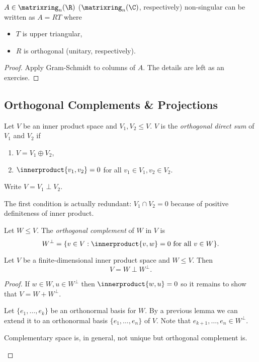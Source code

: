 \documentclass[a4paper]{article}
\newcommand*{\M}{\matrixring}
\newcommand*{\ip}{\innerproduct}
\theoremstyle{definition}
\begin{document}
\begin{proposition}
  \(A \in \M_n(\R)\) (\(\M_n(\C)\), respectively) non-singular can be written as \(A = RT\) where
  \begin{itemize}
  \item \(T\) is upper triangular,
  \item \(R\) is orthogonal (unitary, respectively).
  \end{itemize}
\end{proposition}

\begin{proof}
  Apply Gram-Schmidt to columns of \(A\). The details are left as an exercise.
\end{proof}

\subsection{Orthogonal Complements \& Projections}

\begin{definition}
  Let \(V\) be an inner product space and \(V_1, V_2 \leq V\). \(V\) is the \emph{orthogonal direct sum} of \(V_1\) and \(V_2\) if
  \begin{enumerate}
  \item \(V = V_1 \oplus V_2\),
  \item \(\ip{v_1, v_2} = 0\) for all \(v_1 \in V_1, v_2 \in V_2\).
  \end{enumerate}
  Write \(V = V_1 \perp V_2\).
\end{definition}

\begin{note}
  The first condition is actually redundant: \(V_1 \cap V_2 = 0\) because of positive definiteness of inner product.
\end{note}

\begin{definition}
  Let \(W \leq V\). The \emph{orthogonal complement} of \(W\) in \(V\) is
  \[
    W^\perp = \{v \in V: \ip{v, w} = 0 \text{ for all } v \in W \}.
  \]
\end{definition}

\begin{lemma}
  Let \(V\) be a finite-dimensional inner product space and \(W \leq V\). Then
  \[
    V =  W \perp W^\perp.
  \]
\end{lemma}

\begin{proof}
  If \(w \in W, u \in W^\perp\) then \(\ip{w, u} = 0\) so it remains to show that \(V = W + W^\perp\).

  Let \(\{e_1, \dots, e_k\}\) be an orthonormal basis for \(W\). By a previous lemma we can extend it to an orthonormal basis \(\{e_1, \dots, e_n\}\) of \(V\). Note that \(e_{k + 1}, \dots, e_n \in W^\perp\).

  \begin{note}
    Complementary space is, in general, not unique but orthogonal complement is.
  \end{note}
\end{proof}
\end{document}
